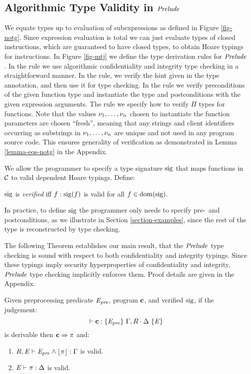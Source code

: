 \subsection{Algorithmic Type Validity in $\mathit{Prelude}$}

\mtjfig

We equate types up to evaluation of subexpressions as defined in
Figure \ref{fig-notg}. Since expression evaluation is total we can
just evaluate types of closed instructions, which are guaranteed to
have closed types, to obtain Hoare typings for instructions. In Figure
\ref{fig-mtj} we define the type derivation rules for $\mathit{Prelude}$. In
the  rule we use algorithmic confidentiality and
integrity type checking in a straightforward manner.  In the
 rule, we verify the hint given in the type
annotation, and then use it for type checking.  In the 
rule we verify preconditions of the given function type and
instantiate the type and postconditions with the given expression
arguments.  The  rule we specify how to verify $\Pi$
types for functions. Note that the values $\nu_1,\ldots,\nu_n$ chosen
to instantiate the function parameters are chosen ``fresh'', meaning
that any strings and client identifiers occurring as substrings in
$\nu_1,\ldots,\nu_n$ are unique and not used in any program source
code. This ensures generality of verification as demonstrated in Lemma
\ref{lemma-eqs-notg} in the Appendix.

We allow the programmer to specify a type signature $\mathrm{sig}$ that
maps functions in $\mathcal{C}$ to valid dependent Hoare
typings. Define:
\begin{definition}
  $\mathrm{sig}$ is \emph{verified} iff $f : \mathrm{sig}(f)$ is valid for all $f \in \mathrm{dom}(\mathrm{sig})$.
\end{definition}
In practice, to define $\mathrm{sig}$ the programmer only needs to specify
pre-~and postconditions, as we illustrate in Section
\ref{section-examples}, since the rest of the type is reconstructed by
type checking.

The following Theorem establishes our main result, that the
$\mathit{Prelude}$ type checking is sound with respect to both
confidentiality and integrity typings. Since these typings imply
security hyperproperties of confidentiality and integrity, $\mathit{Prelude}$
type checking implicitly enforces them. Proof details are given in the
Appendix.
\begin{theorem}
  \label{theorem-mtj}
  Given preprocessing predicate $\mathit{E}_{\mathit{pre}}$, program $\mathbf{c}$, and verified $\mathrm{sig}$, if
  the judgement: $$\vdash \mathbf{c} : \{ \mathit{E}_{\mathit{pre}} \}\ \Gamma,R \cdot \Delta\ \{ \mathit{E} \}$$ is derivable then
  $\mathbf{c} \Rightarrow \pi$ and:
  \begin{enumerate}
  \item $R,\mathit{E} \vdash \mathit{E}_{\mathit{pre}} \wedge \lfloor \pi \rfloor : \Gamma$ is valid.
  \item $\mathit{E} \vdash \pi : \Delta$ is valid.
  \end{enumerate}
\end{theorem}

